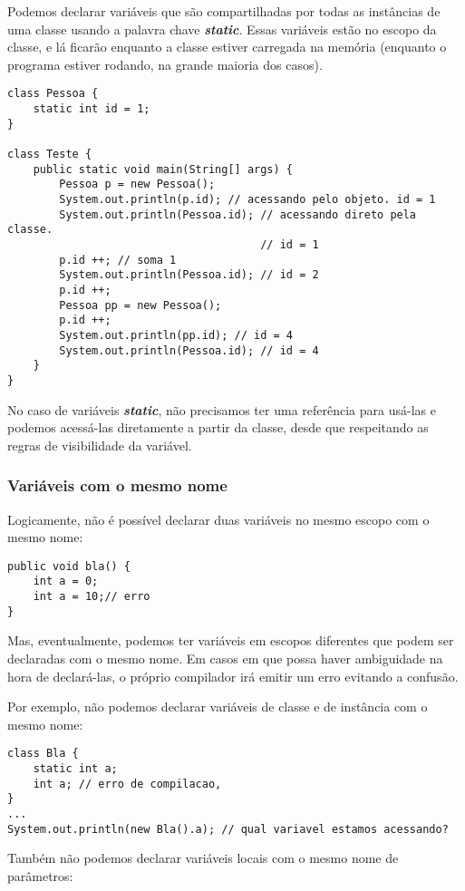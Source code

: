 \documentclass[12pt]{article}
\begin{document}
Podemos declarar variáveis que são compartilhadas por todas as instâncias de uma classe usando a palavra chave \textbf{\textit{static}}. Essas variáveis estão no escopo da classe, e lá ficarão enquanto a classe estiver carregada na memória (enquanto o programa estiver rodando, na grande maioria dos casos).

\begin{lstlisting}
class Pessoa {
	static int id = 1;
}
	
class Teste {
	public static void main(String[] args) {
		Pessoa p = new Pessoa();
		System.out.println(p.id); // acessando pelo objeto. id = 1
		System.out.println(Pessoa.id); // acessando direto pela classe.
		                               // id = 1
		p.id ++; // soma 1
		System.out.println(Pessoa.id); // id = 2
		p.id ++;
		Pessoa pp = new Pessoa(); 
		p.id ++;
		System.out.println(pp.id); // id = 4
		System.out.println(Pessoa.id); // id = 4
	}
}
\end{lstlisting}

No caso de variáveis \textbf{\textit{static}}, não precisamos ter uma referência para usá-las e podemos acessá-las diretamente a partir da classe, desde que respeitando as regras de visibilidade da variável.

\subsubsection{Variáveis com o mesmo nome}

Logicamente, não é possível declarar duas variáveis no mesmo escopo com o mesmo nome:

\begin{lstlisting}
public void bla() {
	int a = 0;
	int a = 10;// erro
}
\end{lstlisting}

Mas, eventualmente, podemos ter variáveis em escopos diferentes que podem ser declaradas com o mesmo nome. Em casos em que possa haver ambiguidade na hora de declará-las, o próprio compilador irá emitir um erro evitando a confusão.

Por exemplo, não podemos declarar variáveis de classe e de instância com o mesmo nome:

\begin{lstlisting}
class Bla {
	static int a;
	int a; // erro de compilacao,
}
...
System.out.println(new Bla().a); // qual variavel estamos acessando?
\end{lstlisting}

Também não podemos declarar variáveis locais com o mesmo nome de parâmetros:
\end{document}

